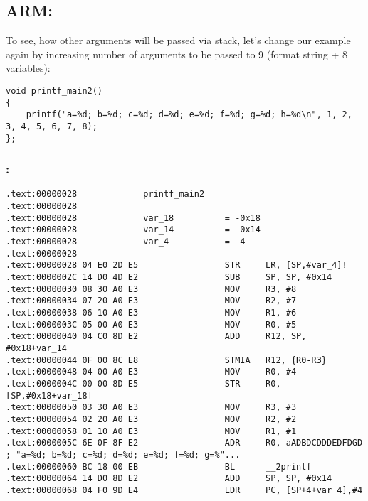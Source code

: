 \subsection{ARM: }

{To see,
how other arguments will be passed via stack, let's change our example again by increasing number of arguments
to be passed to 9 (\printf format string + 8 \Tint variables)}:

\begin{lstlisting}
void printf_main2()
{
	printf("a=%d; b=%d; c=%d; d=%d; e=%d; f=%d; g=%d; h=%d\n", 1, 2, 3, 4, 5, 6, 7, 8);
};
\end{lstlisting}

\subsubsection{\OptimizingKeil: \ARMMode}

\begin{lstlisting}
.text:00000028             printf_main2
.text:00000028
.text:00000028             var_18          = -0x18
.text:00000028             var_14          = -0x14
.text:00000028             var_4           = -4
.text:00000028
.text:00000028 04 E0 2D E5                 STR     LR, [SP,#var_4]!
.text:0000002C 14 D0 4D E2                 SUB     SP, SP, #0x14
.text:00000030 08 30 A0 E3                 MOV     R3, #8
.text:00000034 07 20 A0 E3                 MOV     R2, #7
.text:00000038 06 10 A0 E3                 MOV     R1, #6
.text:0000003C 05 00 A0 E3                 MOV     R0, #5
.text:00000040 04 C0 8D E2                 ADD     R12, SP, #0x18+var_14
.text:00000044 0F 00 8C E8                 STMIA   R12, {R0-R3}
.text:00000048 04 00 A0 E3                 MOV     R0, #4
.text:0000004C 00 00 8D E5                 STR     R0, [SP,#0x18+var_18]
.text:00000050 03 30 A0 E3                 MOV     R3, #3
.text:00000054 02 20 A0 E3                 MOV     R2, #2
.text:00000058 01 10 A0 E3                 MOV     R1, #1
.text:0000005C 6E 0F 8F E2                 ADR     R0, aADBDCDDDEDFDGD ; "a=%d; b=%d; c=%d; d=%d; e=%d; f=%d; g=%"...
.text:00000060 BC 18 00 EB                 BL      __2printf
.text:00000064 14 D0 8D E2                 ADD     SP, SP, #0x14
.text:00000068 04 F0 9D E4                 LDR     PC, [SP+4+var_4],#4
\end{lstlisting}

